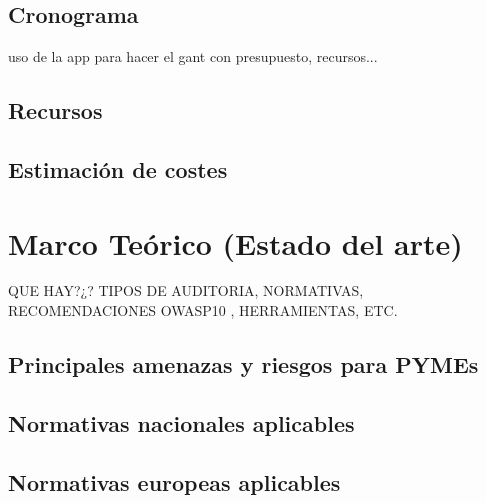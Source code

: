 \documentclass[a4paper, 10pt]{article}
\begin{document}
\subsection{Cronograma}
uso de la app para hacer el gant con presupuesto, recursos...
\subsection{Recursos}

\subsection{Estimación de costes}





\clearpage































\section{Marco Teórico (Estado del arte)}
QUE HAY?¿? TIPOS DE AUDITORIA, NORMATIVAS, RECOMENDACIONES OWASP10 , HERRAMIENTAS, ETC.
\subsection{Principales amenazas y riesgos para PYMEs}
\subsection{Normativas nacionales aplicables}
\subsection{Normativas europeas aplicables}
\end{document}
